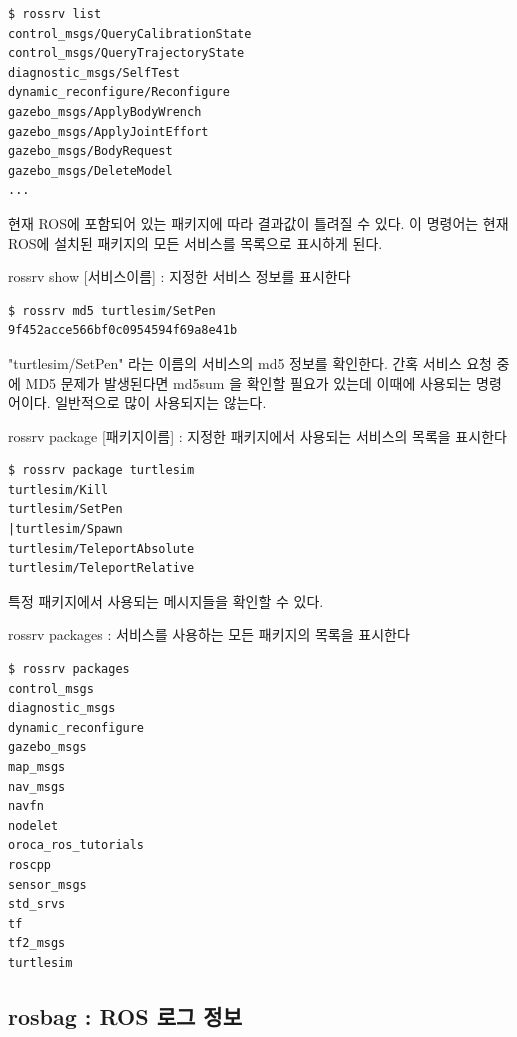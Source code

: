 \begin{lstlisting}[language=ROS]
$ rossrv list
control_msgs/QueryCalibrationState
control_msgs/QueryTrajectoryState
diagnostic_msgs/SelfTest
dynamic_reconfigure/Reconfigure
gazebo_msgs/ApplyBodyWrench
gazebo_msgs/ApplyJointEffort
gazebo_msgs/BodyRequest
gazebo_msgs/DeleteModel
...
\end{lstlisting}

\noindent
현재 ROS에 포함되어 있는 패키지에 따라 결과값이 틀려질 수 있다. 이 명령어는 현재 ROS에 설치된 패키지의 모든 서비스를 목록으로 표시하게 된다.

\vspace{\baselineskip}
\noindent
{}\circled{\thenum} rossrv show [서비스이름] : 지정한 서비스 정보를 표시한다

\begin{lstlisting}[language=ROS]
$ rossrv md5 turtlesim/SetPen 
9f452acce566bf0c0954594f69a8e41b
\end{lstlisting}

\noindent
"turtlesim/SetPen" 라는 이름의 서비스의 md5 정보를 확인한다. 간혹 서비스 요청 중에 MD5 문제가 발생된다면 md5sum 을 확인할 필요가 있는데 이때에 사용되는 명령어이다. 일반적으로 많이 사용되지는 않는다.

\vspace{\baselineskip}
\noindent
{}\circled{\thenum} rossrv package [패키지이름] : 지정한 패키지에서 사용되는 서비스의 목록을 표시한다

\begin{lstlisting}[language=ROS]
$ rossrv package turtlesim 
turtlesim/Kill
turtlesim/SetPen
|turtlesim/Spawn
turtlesim/TeleportAbsolute
turtlesim/TeleportRelative
\end{lstlisting}

\noindent
특정 패키지에서 사용되는 메시지들을 확인할 수 있다.

\vspace{\baselineskip}
\noindent
{}\circled{\thenum} rossrv packages : 서비스를 사용하는 모든 패키지의 목록을 표시한다

\begin{lstlisting}[language=ROS]
$ rossrv packages
control_msgs
diagnostic_msgs
dynamic_reconfigure
gazebo_msgs
map_msgs
nav_msgs
navfn
nodelet
oroca_ros_tutorials
roscpp
sensor_msgs
std_srvs
tf
tf2_msgs
turtlesim
\end{lstlisting}

\subsection{rosbag : ROS 로그 정보}
\label{subsub:Rosbag}

